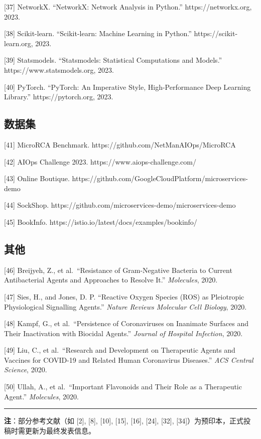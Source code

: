 {[}37{]} NetworkX. ``NetworkX: Network Analysis in Python.''
https://networkx.org, 2023.

{[}38{]} Scikit-learn. ``Scikit-learn: Machine Learning in Python.''
https://scikit-learn.org, 2023.

{[}39{]} Statsmodels. ``Statsmodels: Statistical Computations and
Models.'' https://www.statsmodels.org, 2023.

{[}40{]} PyTorch. ``PyTorch: An Imperative Style, High-Performance Deep
Learning Library.'' https://pytorch.org, 2023.

\hypertarget{ux6570ux636eux96c6-1}{%
\subsection{数据集}\label{ux6570ux636eux96c6-1}}

{[}41{]} MicroRCA Benchmark. https://github.com/NetManAIOps/MicroRCA

{[}42{]} AIOps Challenge 2023. https://www.aiops-challenge.com/

{[}43{]} Online Boutique.
https://github.com/GoogleCloudPlatform/microservices-demo

{[}44{]} SockShop.
https://github.com/microservices-demo/microservices-demo

{[}45{]} BookInfo. https://istio.io/latest/docs/examples/bookinfo/

\hypertarget{ux5176ux4ed6}{%
\subsection{其他}\label{ux5176ux4ed6}}

{[}46{]} Breijyeh, Z., et al.~``Resistance of Gram-Negative Bacteria to
Current Antibacterial Agents and Approaches to Resolve It.''
\emph{Molecules}, 2020.

{[}47{]} Sies, H., and Jones, D. P. ``Reactive Oxygen Species (ROS) as
Pleiotropic Physiological Signalling Agents.'' \emph{Nature Reviews
Molecular Cell Biology}, 2020.

{[}48{]} Kampf, G., et al.~``Persistence of Coronaviruses on Inanimate
Surfaces and Their Inactivation with Biocidal Agents.'' \emph{Journal of
Hospital Infection}, 2020.

{[}49{]} Liu, C., et al.~``Research and Development on Therapeutic
Agents and Vaccines for COVID-19 and Related Human Coronavirus
Diseases.'' \emph{ACS Central Science}, 2020.

{[}50{]} Ullah, A., et al.~``Important Flavonoids and Their Role as a
Therapeutic Agent.'' \emph{Molecules}, 2020.

\begin{center}\rule{0.5\linewidth}{0.5pt}\end{center}

\textbf{注}：部分参考文献（如 {[}2{]}, {[}8{]}, {[}10{]}, {[}15{]},
{[}16{]}, {[}24{]}, {[}32{]},
{[}34{]}）为预印本，正式投稿时需更新为最终发表信息。
